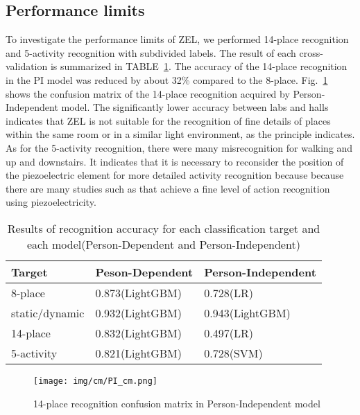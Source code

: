 \documentclass[conference]{IEEEtran}
\begin{document}
\subsection{Performance limits}
To investigate the performance limits of ZEL, we performed 14-place recognition and 5-activity recognition with subdivided labels.
The result of each cross-validation is summarized in TABLE~\ref{tab:cv_for_each_target}.
The accuracy of the 14-place recognition in the PI model was reduced by about 32\% compared to the 8-place.
Fig.~\ref{fig:14places_cm} shows the confusion matrix of the 14-place recognition acquired by Person-Independent model.
The significantly lower accuracy between labs and halls indicates that ZEL is not suitable for the recognition of fine details of places within the same room or in a similar light environment, as the principle indicates.
As for the 5-activity recognition, there were many misrecognition for walking and up and downstairs.
It indicates that it is necessary to reconsider the position of the piezoelectric element for more detailed activity recognition because because there are many studies such as \cite{ma2018sehs} that achieve a fine level of action recognition using piezoelectricity.

\begin{table}[bt]
    \centering
    \caption{Results of recognition accuracy for each classification target and each model(Person-Dependent and Person-Independent)}
    \label{tab:cv_for_each_target}
    \begin{tabular}{lll} \hline
        Target & Peson-Dependent & Person-Independent\\ \hline \hline
        8-place  & 0.873(LightGBM) & 0.728(LR) \\
        static/dynamic & 0.932(LightGBM) & 0.943(LightGBM) \\
        14-place & 0.832(LightGBM) & 0.497(LR) \\
        5-activity & 0.821(LightGBM) & 0.728(SVM) \\
        \hline
    \end{tabular}
\end{table}
\begin{figure}[bt]
     \centering
     \texttt{[image: img/cm/PI\_cm.png]}
     \caption{14-place recognition confusion matrix in Person-Independent model}
     \label{fig:14places_cm}
\end{figure}
\end{document}
